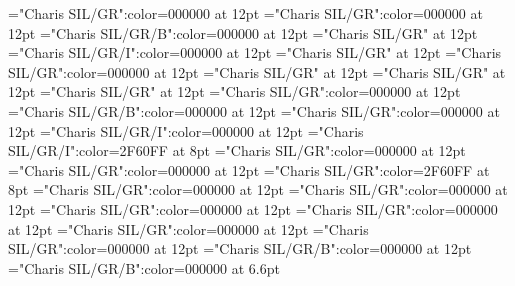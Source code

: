\documentclass[a4paper]{article}
\begin{document}
\pagestyle{plain}
\sloppy
\setlength{\parfillskip}{0pt plus 1fil}
\font\xitemtpi="Charis SIL/GR":color=000000 at 12pt
\font\xitembzhfonipa="Charis SIL/GR":color=000000 at 12pt
\font\xitemxitemheadwordbefore="Charis SIL/GR/B":color=000000 at 12pt
\font\xitemxitemexamplesbefore="Charis SIL/GR" at 12pt
\font\xitemxitemexamplebefore="Charis SIL/GR/I":color=000000 at 12pt
\font\xitemxitemslotsbefore="Charis SIL/GR" at 12pt
\font\entrydicBody="Charis SIL/GR":color=000000 at 12pt
\font{}="Charis SIL/GR" at 12pt
\font{}="Charis SIL/GR" at 12pt
\font{}="Charis SIL/GR" at 12pt
\font\entryletDatadicBody="Charis SIL/GR":color=000000 at 12pt
\font\headwordbzhentryletDatadicBody="Charis SIL/GR/B":color=000000 at 12pt
\font\examplesentryletDatadicBody="Charis SIL/GR":color=000000 at 12pt
\font\examplebzhexamplesentryletDatadicBody="Charis SIL/GR/I":color=000000 at 12pt
\font\xlanguagetagenexamplebzhexamplesentryletDatadicBody="Charis SIL/GR/I":color=2F60FF at 8pt
\font\translationsexamplesentryletDatadicBody="Charis SIL/GR":color=000000 at 12pt
\font\translationentranslationsexamplesentryletDatadicBody="Charis SIL/GR":color=000000 at 12pt
\font\xlanguagetagentranslationentranslationsexamplesentryletDatadicBody="Charis SIL/GR":color=2F60FF at 8pt
\font\relationstranslationsexamplesentryletDatadicBody="Charis SIL/GR":color=000000 at 12pt
\font\xitemrelationstranslationsexamplesentryletDatadicBody="Charis SIL/GR":color=000000 at 12pt
\font\lexreftypeenxitemrelationstranslationsexamplesentryletDatadicBody="Charis SIL/GR":color=000000 at 12pt
\font\lexreftargetsxitemrelationstranslationsexamplesentryletDatadicBody="Charis SIL/GR":color=000000 at 12pt
\font\xitemlexreftargetsxitemrelationstranslationsexamplesentryletDatadicBody="Charis SIL/GR":color=000000 at 12pt
\font\sensecrossrefbzhxitemlexreftargetsxitemrelationstranslationsexamplesentryletDatadicBody="Charis SIL/GR":color=000000 at 12pt
\font\xsensenumberensensecrossrefbzhxitemlexreftargetsxitemrelationstranslationsexamplesentryletDatadicBody="Charis SIL/GR/B":color=000000 at 12pt
\font\xhomographnumberbzhsensecrossrefbzhxitemlexreftargetsxitemrelationstranslationsexamplesentryletDatadicBody="Charis SIL/GR/B":color=000000 at 6.6pt

\mbox{} 
\newpage 
\newpage 
\setcounter{page}{1} 
\pagestyle{fancy} 
\end{document}
